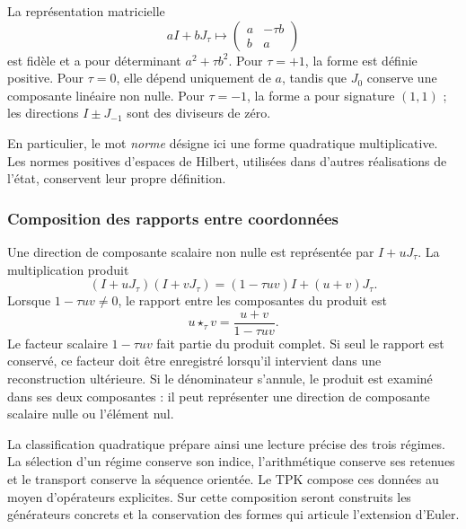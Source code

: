 La représentation matricielle
\[
 aI+bJ_\tau\longmapsto
 \begin{pmatrix}a&-\tau b\\b&a\end{pmatrix}
\]
est fidèle et a pour déterminant \(a^2+\tau b^2\). Pour \(\tau=+1\), la
forme est définie positive. Pour \(\tau=0\), elle dépend uniquement de
\(a\), tandis que \(J_0\) conserve une composante linéaire non nulle. Pour
\(\tau=-1\), la forme a pour signature \((1,1)\) ; les directions
\(I\pm J_{-1}\) sont des diviseurs de zéro.

En particulier, le mot \emph{norme} désigne ici une forme quadratique
multiplicative. Les normes positives d'espaces de Hilbert, utilisées
dans d'autres réalisations de l'état, conservent leur propre définition.

\subsubsection{Composition des rapports entre coordonnées}

Une direction de composante scalaire non nulle est représentée par
\(I+uJ_\tau\). La multiplication produit
\[
 (I+uJ_\tau)(I+vJ_\tau)
 =(1-\tau uv)I+(u+v)J_\tau.
\]
Lorsque \(1-\tau uv\ne0\), le rapport entre les composantes du produit est
\begin{equation}
 u\star_\tau v=\frac{u+v}{1-\tau uv}.
\label{trit:eq:razones}
\end{equation}
Le facteur scalaire \(1-\tau uv\) fait partie du produit complet.
Si seul le rapport est conservé, ce facteur doit être enregistré lorsqu'il
intervient dans une reconstruction ultérieure. Si le dénominateur s'annule,
le produit est examiné dans ses deux composantes : il peut représenter une
direction de composante scalaire nulle ou l'élément nul.

La classification quadratique prépare ainsi une lecture précise des trois
régimes. La sélection d'un régime conserve son indice, l'arithmétique
conserve ses retenues et le transport conserve la séquence orientée.
Le TPK compose ces données au moyen d'opérateurs explicites. Sur cette
composition seront construits les générateurs concrets et la conservation
des formes qui articule l'extension d'Euler.
